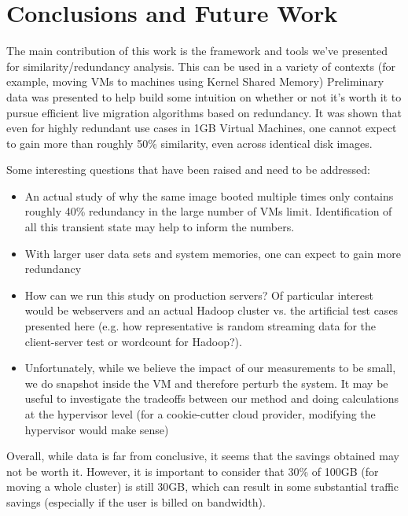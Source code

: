 \documentclass{acm_proc_article-sp}
\begin{document}
\section{Conclusions and Future Work}
The main contribution of this work is the framework and tools we've presented for similarity/redundancy analysis.  This can be used in a variety of contexts (for example, moving VMs to machines using Kernel Shared Memory) Preliminary data was presented to help build some intuition on whether or not it's worth it to pursue efficient live migration algorithms based on redundancy.  It was shown that even for highly redundant use cases in 1GB Virtual Machines, one cannot expect to gain more than roughly 50\% similarity, even across identical disk images.

Some interesting questions that have been raised and need to be addressed:
\begin{itemize}
  \item An actual study of why the same image booted multiple times only contains roughly 40\% redundancy in the large number of VMs limit.  Identification of all this transient state may help to inform the numbers.   
  \item With larger user data sets and system memories, one can expect to gain more redundancy
  \item How can we run this study on production servers? Of particular interest would be webservers and an actual Hadoop cluster vs. the artificial test cases presented here (e.g. how representative is random streaming data for the client-server test or wordcount for Hadoop?).
  \item Unfortunately, while we believe the impact of our measurements to be small, we do snapshot inside the VM and therefore perturb the system.  It may be useful to investigate the tradeoffs between our method and doing calculations at the hypervisor level (for a cookie-cutter cloud provider, modifying the hypervisor would make sense)
\end{itemize}

Overall, while data is far from conclusive, it seems that the savings obtained may not be worth it.  However, it is important to consider that 30\% of 100GB (for moving a whole cluster) is still 30GB, which can result in some substantial traffic savings (especially if the user is billed on bandwidth). 




\end{document}
